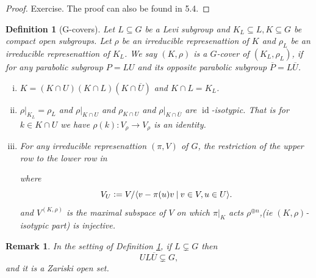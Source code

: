\documentclass[8pt]{article}
\newtheorem{definition}{Definition}[section]
\newtheorem{remark}{Remark}[section]
\DeclareMathOperator{\id}{id}
\newcommand{\defeq}{\vcentcolon=}
\newcommand{\sep}[0]{\:|\:}
\begin{document}
\begin{proof}
  Exercise. The proof can also be found in \cite{Buschnell} 5.4.
\end{proof}

\begin{definition}[G-covers]
  Let $L\subseteq G$ be a Levi subgroup and $K_L\subseteq L,K\subseteq G$ be compact open subgroups. Let $\rho$ be an irreducible represenattion of $K$ and $\rho_L$ be an irreducible represenattion of $K_L$. We say $(K,\rho)$ is a $G$-cover of $(K_L,\rho_L)$, if for any parabolic subgroup $P=LU$ and its opposite parabolic subgroup $\overline{P}=L\overline{U}$.
  \begin{enumerate}[i).]
    \item $K=(K\cap U)(K\cap L)(K\cap\overline{U})$ and $K\cap L = K_L$.
    \item $\rho|_{K_L}=\rho_L$ and $\rho|_{K\cap U}$ and $\rho_{K\cap U}$ and $\rho|_{K\cap\overline{U}}$ are $\id$-isotypic. That is for $k\in K\cap U$ we have $\rho(k):V_\rho\to V_\rho$ is an identity.
    \item For any irreducible represenattion $(\pi,V)$ of $G$, the restriction of the upper row to the lower row in 
    \begin{center}
    \end{center}
    where
    \begin{equation*}
      V_U \defeq V/\langle v-\pi(u)v\sep v\in V,u\in U\rangle.
    \end{equation*}
    and $V^{(K,\rho)}$ is the maximal subspace of $V$ on which $\pi|_K$ acts $\rho^{\oplus n}$,(ie $(K,\rho)$-isotypic part) is injective. 
  \end{enumerate}
  \label{definition_g_cover}
\end{definition}

\begin{remark}
  In the setting of Definition \ref{definition_g_cover}, if $L\subsetneq G$ then
  \begin{equation*}
    UL\overline{U}\subsetneq G,
  \end{equation*}
  and it is a Zariski open set.
\end{remark}
\end{document}

